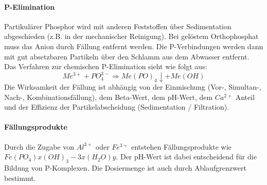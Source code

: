 \documentclass[9pt, openright=false]{scrartcl}
\begin{document}
\paragraph{P-Elimination} Partikulärer Phosphor wird mit anderen Feststoffen über Sedimentation abgeschieden (z.B. in der mechanischer Reinigung). Bei gelöstem Orthophosphat muss das Anion durch Fällung entfernt werden. Die P-Verbindungen werden dann mit gut absetzbaren Partikeln über den Schlamm aus dem Abwasser entfernt. Das Verfahren zur chemischen P-Elimination sieht wie folgt aus:
\[Me^{3+} + PO_4^{3-} \Rightarrow Me(PO)_4\downarrow + Me (OH)\]
Die Wirksamkeit der Fällung ist abhängig von der Einmischung (Vor-, Simultan-, Nach-, Kombinationsfällung), dem Beta-Wert, dem pH-Wert, dem $Ca^{2+}$ Anteil und der Effizienz der Partikelabscheidung (Sedimentation / Filtration).
\paragraph{Fällungsprodukte} Durch die Zugabe von $Al^{3+}$ oder $Fe^{3+}$ entstehen Fällungsprodukte wie $Fe(PO_4)x(OH)_3-3x(H_2O)y$. Der pH-Wert ist dabei entscheidend für die Bildung von P-Komplexen. Die Dosiermenge ist auch durch Ablaufgrenzwert bestimmt.
\end{document}
